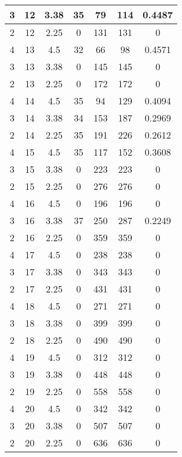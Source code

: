 \documentclass[letterpaper, 12pt]{article}
\begin{document}
\begin{longtable}{|c|c|c|c|c|c|c|}
\hline
3 & 12 & 3.38 & 35 & 79 & 114 & 0.4487 \\
\hline
2 & 12 & 2.25 & 0 & 131 & 131 & 0 \\
\hline
4 & 13 & 4.5 & 32 & 66 & 98 & 0.4571 \\
\hline
3 & 13 & 3.38 & 0 & 145 & 145 & 0 \\
\hline
2 & 13 & 2.25 & 0 & 172 & 172 & 0 \\
\hline
4 & 14 & 4.5 & 35 & 94 & 129 & 0.4094 \\
\hline
3 & 14 & 3.38 & 34 & 153 & 187 & 0.2969 \\
\hline
2 & 14 & 2.25 & 35 & 191 & 226 & 0.2612 \\
\hline
4 & 15 & 4.5 & 35 & 117 & 152 & 0.3608 \\
\hline
3 & 15 & 3.38 & 0 & 223 & 223 & 0 \\
\hline
2 & 15 & 2.25 & 0 & 276 & 276 & 0 \\
\hline
4 & 16 & 4.5 & 0 & 196 & 196 & 0 \\
\hline
3 & 16 & 3.38 & 37 & 250 & 287 & 0.2249 \\
\hline
2 & 16 & 2.25 & 0 & 359 & 359 & 0 \\
\hline
4 & 17 & 4.5 & 0 & 238 & 238 & 0 \\
\hline
3 & 17 & 3.38 & 0 & 343 & 343 & 0 \\
\hline
2 & 17 & 2.25 & 0 & 431 & 431 & 0 \\
\hline
4 & 18 & 4.5 & 0 & 271 & 271 & 0 \\
\hline
3 & 18 & 3.38 & 0 & 399 & 399 & 0 \\
\hline
2 & 18 & 2.25 & 0 & 490 & 490 & 0 \\
\hline
4 & 19 & 4.5 & 0 & 312 & 312 & 0 \\
\hline
3 & 19 & 3.38 & 0 & 448 & 448 & 0 \\
\hline
2 & 19 & 2.25 & 0 & 558 & 558 & 0 \\
\hline
4 & 20 & 4.5 & 0 & 342 & 342 & 0 \\
\hline
3 & 20 & 3.38 & 0 & 507 & 507 & 0 \\
\hline
2 & 20 & 2.25 & 0 & 636 & 636 & 0 \\
\hline
\end{longtable}
\end{document}
